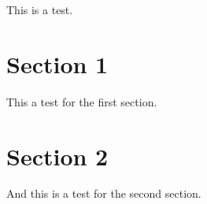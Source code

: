 This is a test.
\section{Section 1}
This a test for the first section.
\section{Section 2}
And this is a test for the second section.
